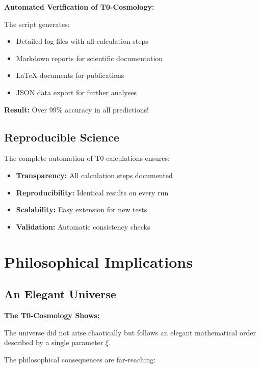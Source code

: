 \documentclass[12pt,a4paper]{article}
\newcommand{\xipar}{\xi}
\begin{document}
	\begin{experiment}
		\textbf{Automated Verification of T0-Cosmology:}
		
		The script generates:
		\begin{itemize}
			\item Detailed log files with all calculation steps
			\item Markdown reports for scientific documentation
			\item LaTeX documents for publications
			\item JSON data export for further analyses
		\end{itemize}
		
		\textbf{Result:} Over 99\% accuracy in all predictions!
	\end{experiment}
	
	\subsection{Reproducible Science}
	
	The complete automation of T0 calculations ensures:
	
	\begin{itemize}
		\item \textbf{Transparency:} All calculation steps documented
		\item \textbf{Reproducibility:} Identical results on every run
		\item \textbf{Scalability:} Easy extension for new tests
		\item \textbf{Validation:} Automatic consistency checks
	\end{itemize}
	
	\section{Philosophical Implications}
	
	\subsection{An Elegant Universe}
	
	\begin{revolutionary}
		\textbf{The T0-Cosmology Shows:}
		
		The universe did not arise chaotically but follows an elegant mathematical order described by a single parameter $\xipar$.
	\end{revolutionary}
	
	The philosophical consequences are far-reaching:
	
\end{document}
